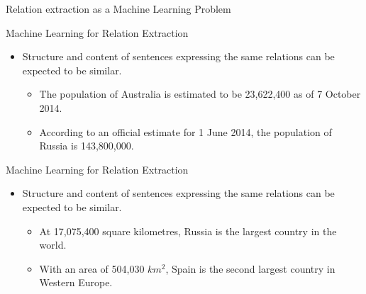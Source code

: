 \documentclass{beamer}
\begin{document}
\begin{frame}
\begin{block}{Relation extraction as a Machine Learning Problem}
\end{block}
\end{frame}

\begin{frame}{Machine Learning for Relation Extraction}
 \begin{itemize}
  \item Structure and content of sentences expressing the same relations can be expected to be similar. 
 \begin{itemize}
      \item The population of Australia is estimated to be 23,622,400 as of 7 October 2014.
      \item According to an official estimate for 1 June 2014, the population of Russia is 143,800,000.   
   \end{itemize}   
 \end{itemize}
\end{frame}

\begin{frame}{Machine Learning for Relation Extraction}
\begin{itemize}
\item  Structure and content of sentences expressing the same relations can be expected to be similar. 
 \begin{itemize}   
    \item At 17,075,400 square kilometres, Russia is the largest country in the world.
    \item With an area of 504,030 $km^{2}$, Spain is the second largest country in Western Europe.
    \end{itemize}
 \end{itemize}
\end{frame}
\end{document}
